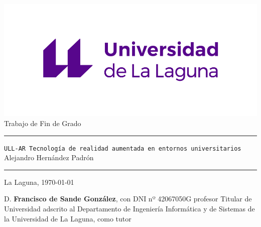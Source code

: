 \documentclass[spanish,a4paper,12pt,oneside]{extreport}
\newcommand{\BulletP}{\texttt{ULL-AR{ Tecnología de realidad aumentada en entornos universitarios}}}
\begin{document}
\renewcommand{\lstlistingname}{Listado}%

\pagestyle{empty}
\thispagestyle{empty}


\newcommand{\HRule}{\rule{\linewidth}{1mm}}
\setlength{\parindent}{0mm}
\setlength{\parskip}{0mm}


\begin{center}
\includegraphics[scale=1.1]{images/marca-universidad-de-la-laguna-original}\\[15mm]
{\Huge Trabajo de Fin de Grado}
\end{center}

\HRule
\begin{flushright}
        {\Huge \BulletP{}} \\[2.5mm]
        {\Large Alejandro Hernández Padrón} \\[5mm]


\end{flushright}
\HRule
{}
\begin{center}
  \Large La Laguna, \today
\end{center}

\setlength{\parindent}{5mm}

\newpage
\thispagestyle{empty}

D. {\bf Francisco de Sande González}, con DNI nº 42067050G
profesor
Titular de Universidad
adscrito al Departamento
de Ingeniería Informática y de Sistemas
de la Universidad de La Laguna, como tutor
\end{document}
